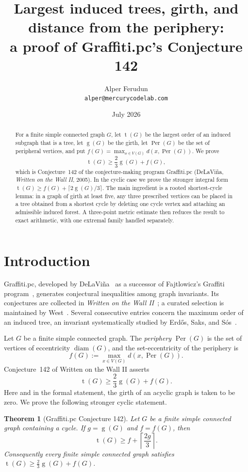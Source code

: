 \documentclass[11pt]{article}
\title{Largest induced trees, girth, and distance from the periphery:\\
a proof of Graffiti.pc's Conjecture 142}
\author{Alper Ferudun\\\texttt{alper@mercurycodelab.com}}
\date{July 2026}
\numberwithin{equation}{section}
\newtheorem{theorem}{Theorem}[section]
\theoremstyle{remark}
\newcommand{\tr}{\operatorname{t}}
\newcommand{\gr}{\operatorname{g}}
\newcommand{\diam}{\operatorname{diam}}
\newcommand{\Per}{\operatorname{Per}}
\begin{document}
\maketitle

\begin{abstract}
For a finite simple connected graph $G$, let $\tr(G)$ be the largest order of
an induced subgraph that is a tree, let $\gr(G)$ be the girth, let
$\Per(G)$ be the set of peripheral vertices, and put
$f(G)=\max_{x\in V(G)}d(x,\Per(G))$.  We prove
\[
  \tr(G)\ge \frac{2}{3}\gr(G)+f(G),
\]
which is Conjecture~142 of the conjecture-making program Graffiti.pc
(DeLaVi\~na, \emph{Written on the Wall II}, 2005).  In the cyclic case we
prove the stronger integral form
$\tr(G)\ge f(G)+\lceil2\gr(G)/3\rceil$.
The main ingredient is a rooted shortest-cycle lemma: in a graph of girth at
least five, any three prescribed vertices can be placed in a tree obtained
from a shortest cycle by deleting one cycle vertex and attaching an
admissible induced forest.  A three-point metric estimate then reduces the
result to exact arithmetic, with one extremal family handled separately.
\end{abstract}

\section{Introduction}

Graffiti.pc, developed by DeLaVi\~na~\cite{DeL01,DeLhistory} as a successor
of Fajtlowicz's Graffiti program~\cite{Faj88}, generates conjectural
inequalities among graph invariants.  Its conjectures are collected in
\emph{Written on the Wall II}~\cite{WOWII}; a curated selection is maintained
by West~\cite{WestReg}.  Several consecutive entries concern the maximum
order of an induced tree, an invariant systematically studied by Erd\H{o}s,
Saks, and S\'os~\cite{ESS86}.

Let $G$ be a finite simple connected graph.  The \emph{periphery}
$\Per(G)$ is the set of vertices of eccentricity $\diam(G)$, and the
set-eccentricity of the periphery is
\[
 f(G):=\max_{x\in V(G)} d(x,\Per(G)).
\]
Conjecture~142 of Written on the Wall II asserts
\[
  \tr(G)\ge \frac23\gr(G)+f(G).
\]
Here and in the formal statement, the girth of an acyclic graph is taken to
be zero.  We prove the following stronger cyclic statement.

\begin{theorem}[Graffiti.pc Conjecture 142]\label{thm:main}
Let $G$ be a finite simple connected graph containing a cycle.  If
$g=\gr(G)$ and $f=f(G)$, then
\[
  \tr(G)\ge f+\left\lceil\frac{2g}{3}\right\rceil .
\]
Consequently every finite simple connected graph satisfies
$\tr(G)\ge \frac23\gr(G)+f(G)$.
\end{theorem}
\end{document}
